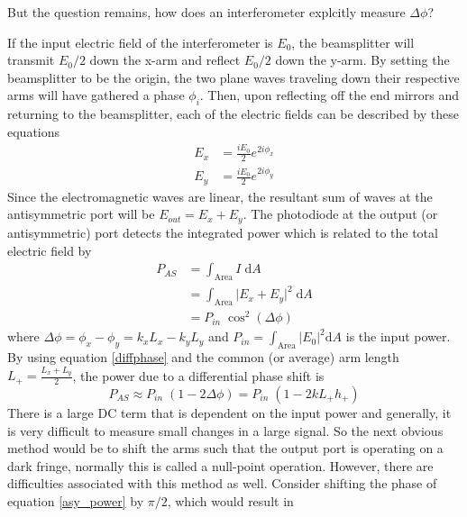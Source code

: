 		But the question remains, how does an interferometer explcitly measure $\Delta \phi$?
		
		If the input electric field of the interferometer is $E_0$, the beamsplitter will transmit $E_0 /2$ down the x-arm and reflect $E_0 /2$ down the y-arm.  By setting the beamsplitter to be the origin, the two plane waves traveling down their respective arms will have gathered a phase $\phi_i$. Then, upon reflecting off the end mirrors and returning to the beamsplitter, each of the electric fields can be described by these equations
			\begin{equation}
			\begin{aligned}
				E_{x} 	&=	\frac{i E_0}{2} e^{2i\phi_{x}}	
			\\	E_{y} 	&=	\frac{i E_0}{2} e^{2i\phi_{y}}
			\end{aligned}
			\end{equation}
		Since the electromagnetic waves are linear, the resultant sum of waves at the antisymmetric port will be $E_{out} = E_x + E_y$. The photodiode at the output (or antisymmetric) port detects the integrated power which is related to the total electric field by
			\begin{equation}
			\begin{aligned}\label{asy_power}
				P_{AS}	&= \int_{\text{Area}} I \;				\text{d}A 
			\\			&= \int_{\text{Area}} \vert E_x + E_y \vert^2 \;	\text{d}A 
			\\			&= P_{in} \; \cos^2(\Delta \phi)
			\end{aligned}
			\end{equation}	
		where $\Delta \phi = \phi_{x} - \phi_{y} = k_x L_x - k_y L_y$ and $P_{in} = \int_{\text{Area}}	 \vert E_0\vert^2 \text{d}A$ is the input power. By using equation \ref{diffphase} and the common (or average) arm length $L_{+} = \frac{L_x + L_y}{2}$, the power due to a differential phase shift is
			\begin{equation}
			P_{AS} \approx P_{in} \; (1-2 \Delta \phi) = P_{in} \; (1-2 k L_{+} h_{+})
			\end{equation}
		There is a large DC term that is dependent on the input power and generally, it is very difficult to measure small changes in a large signal. So the next obvious method would be to shift the arms such that the output port is operating on a dark fringe, normally this is called a null-point operation.  However, there are difficulties associated with this method as well.  
		Consider shifting the phase of equation \ref{asy_power} by $\pi/2$, which would result in
